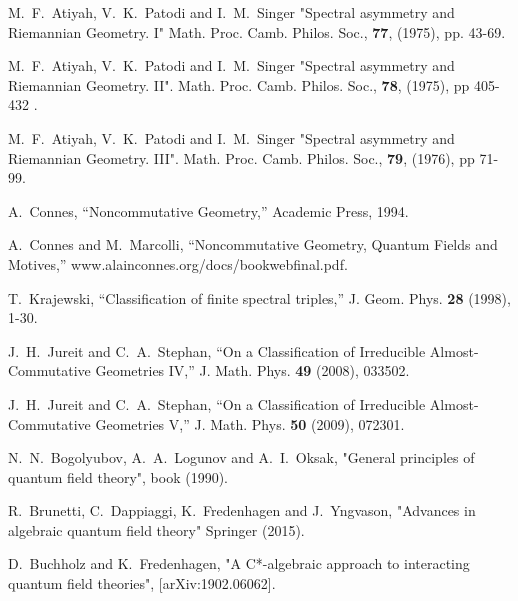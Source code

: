 \documentclass[12pt]{article}
\begin{document}
\begin{thebibliography}{99}
M.~F.~Atiyah, V.~K.~Patodi and I.~M.~Singer
"Spectral asymmetry and Riemannian Geometry. I"
Math. Proc. Camb. Philos. Soc., {\bf 77}, (1975), pp. 43-69.


M.~F.~Atiyah, V.~K.~Patodi and I.~M.~Singer
"Spectral asymmetry and Riemannian Geometry. II". Math. Proc. Camb. Philos. Soc., {\bf 78}, (1975), pp 405-432 .


M.~F.~Atiyah, V.~K.~Patodi and I.~M.~Singer
"Spectral asymmetry and Riemannian Geometry. III". Math. Proc. Camb. Philos. Soc., {\bf 79}, (1976), pp 71-99.

 


A.~Connes,
``Noncommutative Geometry,'' Academic Press, 1994.


A.~Connes and M.~Marcolli,
``Noncommutative Geometry, Quantum Fields and Motives,''
 www.alainconnes.org/docs/bookwebfinal.pdf. 


T.~Krajewski,
``Classification of finite spectral triples,''
J. Geom. Phys. \textbf{28} (1998), 1-30.


J.~H.~Jureit and C.~A.~Stephan,
``On a Classification of Irreducible Almost-Commutative Geometries IV,''
J. Math. Phys. \textbf{49} (2008), 033502.



J.~H.~Jureit and C.~A.~Stephan,
``On a Classification of Irreducible Almost-Commutative Geometries V,''
J. Math. Phys. \textbf{50} (2009), 072301.





N.~N.~Bogolyubov, A.~A.~Logunov and A.~I.~Oksak,
"General principles of quantum field theory",
book (1990).



R.~Brunetti, C.~Dappiaggi, K.~Fredenhagen and J.~Yngvason, 
"Advances in algebraic quantum field theory"
Springer (2015). 


  

D.~Buchholz and K.~Fredenhagen, "A C*-algebraic approach to interacting quantum field theories",
[arXiv:1902.06062].







\end{thebibliography}
\end{document}
